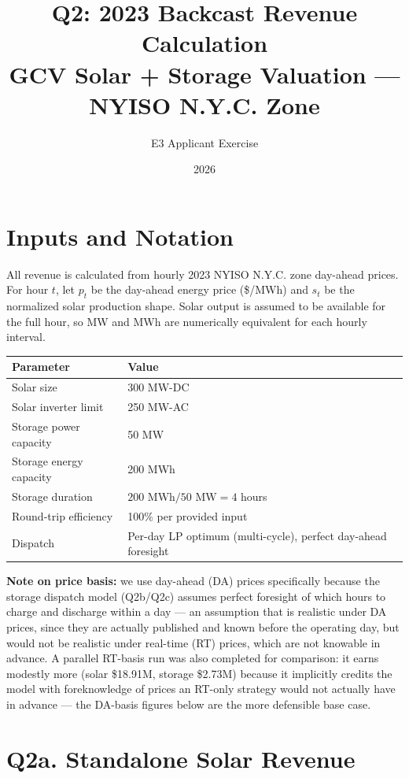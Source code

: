 \documentclass[11pt]{article}
\title{\textbf{Q2: 2023 Backcast Revenue Calculation}\\
\large GCV Solar + Storage Valuation --- NYISO N.Y.C. Zone}
\author{E3 Applicant Exercise}
\date{2026}
\begin{document}
\maketitle

\section*{Inputs and Notation}

All revenue is calculated from hourly 2023 NYISO N.Y.C. zone day-ahead prices.
For hour $t$, let $p_t$ be the day-ahead energy price (\$/MWh) and $s_t$ be the
normalized solar production shape. Solar output is assumed to be available for
the full hour, so MW and MWh are numerically equivalent for each hourly interval.

\begin{table}[h!]
\centering
\begin{tabular}{ll}
\toprule
\textbf{Parameter} & \textbf{Value} \\
\midrule
Solar size & 300 MW-DC \\
Solar inverter limit & 250 MW-AC \\
Storage power capacity & 50 MW \\
Storage energy capacity & 200 MWh \\
Storage duration & $200\text{ MWh} / 50\text{ MW} = 4$ hours \\
Round-trip efficiency & 100\% per provided input \\
Dispatch & Per-day LP optimum (multi-cycle), perfect day-ahead foresight \\
\bottomrule
\end{tabular}
\end{table}

\textbf{Note on price basis:} we use day-ahead (DA) prices specifically because the
storage dispatch model (Q2b/Q2c) assumes perfect foresight of which hours to charge and
discharge within a day --- an assumption that is realistic under DA prices, since they are
actually published and known before the operating day, but would not be realistic under
real-time (RT) prices, which are not knowable in advance. A parallel RT-basis run was also
completed for comparison: it earns modestly more (solar \$18.91M, storage \$2.73M) because
it implicitly credits the model with foreknowledge of prices an RT-only strategy would not
actually have in advance --- the DA-basis figures below are the more defensible base case.

\section*{Q2a. Standalone Solar Revenue}
\end{document}
